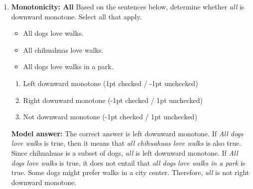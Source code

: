 \documentclass[a4,11pt]{article}
\begin{document}
\begin{enumerate}[leftmargin = 12pt]
      \begin{enumerate}[noitemsep]
        \item Left downward monotone (1pt checked / -1pt unchecked)
        \item Right downward monotone (1pt checked / -1pt unchecked)
        \item Not downward monotone (-1pt checked / 1pt unchecked)
	\end{enumerate}	

{\bf Model answer:} The correct answers are left and right downward monotone. If \textit{Few athletes play piano} is true, then it means that \textit{few footballers play piano.} is also true. Since footballers is a subset of athletes, few is left downward monotone. If \textit{Few athletes play piano} is true, then it is also true that \textit{few athletes play piano well}, since the set containing all entities that play piano well is a subset of  the set that contains all entities that play piano.


\item {\bf Monotonicity: All} Based on the sentences below, determine whether \textit{all} is downward monotone. Select all that apply. 
\begin{itemize}[noitemsep]
\item All dogs love walks.
\item All chihuahuas love walks.
\item All dogs love walks in a park.
\end{itemize}


      \begin{enumerate}[noitemsep]
        \item Left downward monotone (1pt checked / -1pt unchecked)
        \item Right downward monotone (-1pt checked / 1pt unchecked)
        \item Not downward monotone (-1pt checked / 1pt unchecked)
	\end{enumerate}	
	

{\bf Model answer:} The correct answer is left downward monotone. If \textit{All dogs love walks} is true, then it means that \textit{all chihuahuas love walks} is also true. Since chihuahuas is a subset of dogs, \textit{all} is left downward monotone. If \textit{All dogs love walks} is true, it does not entail that \textit{all dogs love walks in a park} is true. Some dogs might prefer walks in a city center. Therefore, \textit{all} is not right downward monotone.


\end{enumerate}
\end{document}

